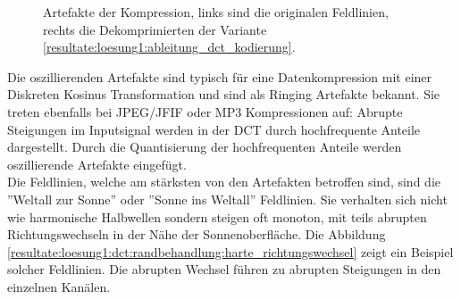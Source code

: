 \begin{figure}[!htbp]
	\center
	\caption{Artefakte der Kompression, links sind die originalen Feldlinien, rechts die Dekomprimierten der Variante \ref{resultate:loesung1:ableitung_dct_kodierung}.}
	\label{resultate:loesung1:dct:randbehandlung:jvhartefakte_loesung6}
\end{figure}
Die oszillierenden Artefakte sind typisch für eine Datenkompression mit einer Diskreten Kosinus Transformation und sind als Ringing Artefakte \cite{wiki:ringing:artefacts} bekannt. Sie treten ebenfalls bei JPEG/JFIF oder MP3 Kompressionen auf: Abrupte Steigungen im Inputsignal werden in der DCT durch hochfrequente Anteile dargestellt. Durch die Quantisierung der hochfrequenten Anteile werden oszillierende Artefakte eingefügt.\\
Die Feldlinien, welche am stärksten von den Artefakten betroffen sind, sind die ''Weltall zur Sonne'' oder ''Sonne ins Weltall'' Feldlinien. Sie verhalten sich nicht wie harmonische Halbwellen sondern steigen oft monoton, mit teils abrupten Richtungswechseln in der Nähe der Sonnenoberfläche. Die Abbildung \ref{resultate:loesung1:dct:randbehandlung:harte_richtungswechsel} zeigt ein Beispiel solcher Feldlinien. Die abrupten Wechsel führen zu abrupten Steigungen in den einzelnen Kanälen.

